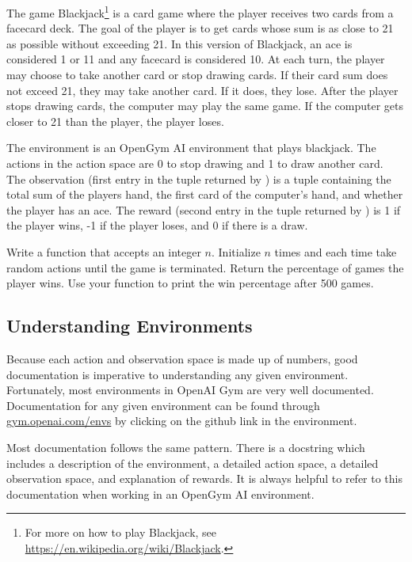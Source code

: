 \begin{problem}
The game Blackjack\footnote{For more on how to play Blackjack, see \url{https://en.wikipedia.org/wiki/Blackjack}.} is a card game where the player receives two cards from a facecard deck.
The goal of the player is to get cards whose sum is as close to 21 as possible without exceeding 21.
In this version of Blackjack, an ace is considered 1 or 11 and any facecard is considered 10.
At each turn, the player may choose to take another card or stop drawing cards.
If their card sum does not exceed 21, they may take another card.
If it does, they lose.
After the player stops drawing cards, the computer may play the same game.
If the computer gets closer to 21 than the player, the player loses.

The environment  is an OpenGym AI environment that plays blackjack.
The actions in the action space are 0 to stop drawing and 1 to draw another card.
The observation (first entry in the tuple returned by ) is a tuple containing the total sum of the players hand, the first card of the computer's hand, and whether the player has an ace.
The reward (second entry in the tuple returned by ) is 1 if the player wins, -1 if the player loses, and 0 if there is a draw.

Write a function  that accepts an integer $n$.
Initialize  $n$ times and each time take random actions until the game is terminated.
Return the percentage of games the player wins.
Use your function to print the win percentage after 500 games.

\label{prob:random-blackjack}
\end{problem}

\subsection*{Understanding Environments}

Because each action and observation space is made up of numbers, good documentation is imperative to understanding any given environment.
Fortunately, most environments in OpenAI Gym are very well documented.
Documentation for any given environment can be found through \url{gym.openai.com/envs} by clicking on the github link in the environment.

Most documentation follows the same pattern.
There is a docstring which includes a description of the environment, a detailed action space, a detailed observation space, and explanation of rewards.
It is always helpful to refer to this documentation when working in an OpenGym AI environment.

